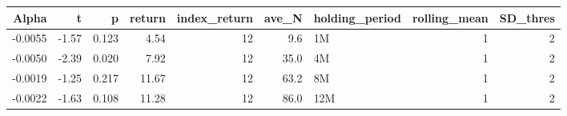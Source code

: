 \begin{table}[ht]
\centering
\begin{tabular}{rrrrrrlrr}
  \hline
Alpha & t & p & return & index\_return & ave\_N & holding\_period & rolling\_mean & SD\_thres \\ 
  \hline
-0.0055 & -1.57 & 0.123 & 4.54 & 12 & 9.6 & 1M &  1 &  2 \\ 
  -0.0050 & -2.39 & 0.020 & 7.92 & 12 & 35.0 & 4M &  1 &  2 \\ 
  -0.0019 & -1.25 & 0.217 & 11.67 & 12 & 63.2 & 8M &  1 &  2 \\ 
  -0.0022 & -1.63 & 0.108 & 11.28 & 12 & 86.0 & 12M &  1 &  2 \\ 
   \hline
\end{tabular}
\end{table}

